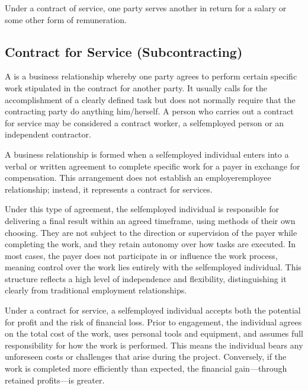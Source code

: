 \documentclass[letterpaper,10pt,english]{sphinxmanual}
\begin{document}
\sphinxAtStartPar
Under a contract of service, one party serves another in return for a salary or some other form
of remuneration.


\subsection{Contract for Service (Subcontracting)}
\label{\detokenize{compliance:contract-for-service-subcontracting}}
\sphinxAtStartPar
A  is a business relationship whereby one party agrees to perform certain
specific work stipulated in the contract for another party. It usually calls for the
accomplishment of a clearly defined task but does not normally require that the contracting
party do anything him/herself. A person who carries out a contract for service may be
considered a contract worker, a self\sphinxhyphen{}employed person or an independent contractor.

\sphinxAtStartPar
A business relationship is formed when a self\sphinxhyphen{}employed individual enters into a verbal or written agreement to complete
specific work for a payer in exchange for compensation. This arrangement does not establish an employer\sphinxhyphen{}employee relationship;
instead, it represents a contract for services.

\sphinxAtStartPar
Under this type of agreement, the self\sphinxhyphen{}employed individual is responsible for delivering a final result within an agreed
timeframe, using methods of their own choosing. They are not subject to the direction or supervision of the payer while
completing the work, and they retain autonomy over how tasks are executed. In most cases, the payer does not participate in
or influence the work process, meaning control over the work lies entirely with the self\sphinxhyphen{}employed individual. This structure
reflects a high level of independence and flexibility, distinguishing it clearly from traditional employment relationships.

\sphinxAtStartPar
Under a contract for service, a self\sphinxhyphen{}employed individual accepts both the potential for profit and the risk of financial loss.
Prior to engagement, the individual agrees on the total cost of the work, uses personal tools and equipment, and assumes full
responsibility for how the work is performed. This means the individual bears any unforeseen costs or challenges that arise
during the project. Conversely, if the work is completed more efficiently than expected, the financial gain—through retained
profits—is greater.
\end{document}
